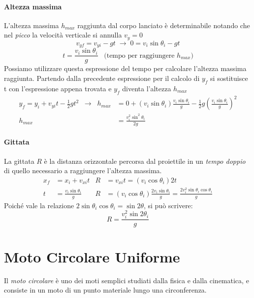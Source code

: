 \documentclass[a4paper,11pt,oneside]{book}
\begin{document}
\paragraph{Altezza massima}
L'altezza massima $h_{max}$ raggiunta dal corpo lanciato è determinabile notando che nel \emph{picco} la velocità verticale si annulla $v_y = 0$
\begin{equation*}
    v_{yf} = v_{yi} - gt \; \rightarrow \; 0 = v_i \sin{\theta_i} -gt
\end{equation*}
\begin{equation*}
    t = \frac{v_i \sin{\theta_i}}{g} \;\;\; \text{(tempo per raggiungere } h_{max} \text{)}
\end{equation*}
Possiamo utilizzare questa espressione del tempo per calcolare l'altezza massima raggiunta. Partendo dalla precedente espressione per il calcolo di
$y_f$ si sostituisce t con l'espressione appena trovata e $y_f$ diventa l'altezza $h_{max}$
\begin{align*}
    y_f = y_i + v_{yi}t - \tfrac{1}{2}gt^2 \;\; \rightarrow \;\; h_{max} & = 0 + (v_i \sin{\theta_i})\tfrac{v_i \sin{\theta_i}}{g} - \tfrac{1}{2}g(\tfrac{v_i \sin{\theta_i}}{g})^2 \\
    h_{max}                                                              & = \frac{v_i^2 \sin^2{\theta_i}}{2g}
\end{align*}

\paragraph{Gittata}
La gittata $R$ è la distanza orizzontale percorsa dal proiettile in un \emph{tempo doppio} di quello necessario a raggiungere l'altezza massima.
\begin{align*}
    x_f & = x_i + v_{xi}t                 & R & = v_{xi}t = (v_i \cos{\theta_i})2t                                                                     \\
    t   & = \tfrac{v_i \sin{\theta_i}}{g} & R & = (v_i \cos{\theta_i}) \tfrac{2v_i \sin{\theta_i}}{g} = \tfrac{2v_i^2 \sin{\theta_i}\cos{\theta_i}}{g}
\end{align*}
Poiché vale la relazione $2\sin{\theta_i}\cos{\theta_i} = \sin{2\theta}$, si può scrivere:
\begin{equation*}
    R = \frac{v_i^2 \sin{2\theta_i}}{g}
\end{equation*}


\section{Moto Circolare Uniforme}
Il \emph{moto circolare} è uno dei moti semplici studiati dalla fisica e dalla cinematica, e consiste in un moto di un punto materiale lungo una circonferenza. 
\end{document}
